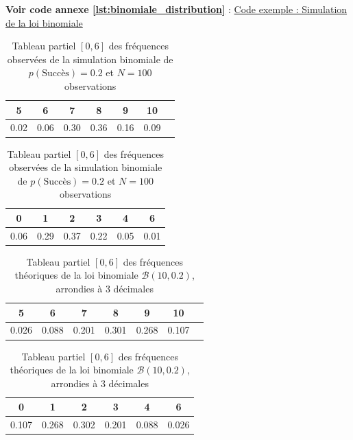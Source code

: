     \textbf{Voir code annexe \ref{lst:binomiale_distribution}} : \hyperlink{\ref{lst:binomiale_distribution}}{Code exemple : Simulation de la loi binomiale}
    \begin{table}[H]
      \centering
      \begin{minipage}{0.45\textwidth}
      \centering
      \begin{tabular}{c c c c c c c}
        \toprule
        5 & 6 & 7 & 8 & 9 & 10 \\
        \midrule
        0.02 & 0.06 & 0.30 & 0.36 & 0.16 & 0.09 \\
        \bottomrule
      \end{tabular}
      \caption{Tableau partiel $[5,10]$ des fréquences observées de la simulation binomiale de $p(\text{Succès})=0.8$ et $N=100$ observations}
      \label{tab:binomiale_1}
      \end{minipage}
      \hfill
      \begin{minipage}{0.45\textwidth}
      \centering
      \begin{tabular}{c c c c c c }
        \toprule
        0 & 1 & 2 & 3 & 4 & 6 \\
        \midrule
        0.06 & 0.29 & 0.37 & 0.22 & 0.05 & 0.01 \\
        \bottomrule
      \end{tabular}
      \caption{Tableau partiel $[0,6]$ des fréquences observées de la simulation binomiale de $p(\text{Succès})=0.2$ et $N=100$ observations}
      \label{tab:binomiale_2}
      \end{minipage}
    \end{table}

    \begin{table}[H]
      \centering
      \begin{minipage}{0.45\textwidth}
        \centering
          \begin{tabular}{c c c c c c c}
            \toprule
            5 & 6 & 7 & 8 & 9 & 10 \\
            \midrule
            0.026 & 0.088 & 0.201 & 0.301 & 0.268 & 0.107 \\
            \bottomrule
          \end{tabular}
          \caption{Tableau partiel $[5,10]$ des fréquences théoriques de la loi binomiale $\mathcal{B}(10, 0.8)$, arrondies à 3 décimales}
          \label{tab:binomiale_3}
      \end{minipage}
      \hfill
      \begin{minipage}{0.45\textwidth}
        \centering
        \begin{tabular}{c c c c c c }
          \toprule
          0 & 1 & 2 & 3 & 4 & 6 \\
          \midrule
          0.107 & 0.268 & 0.302 & 0.201 & 0.088 & 0.026 \\
          \bottomrule
        \end{tabular}
        \caption{Tableau partiel $[0,6]$ des fréquences théoriques de la loi binomiale $\mathcal{B}(10, 0.2)$, arrondies à 3 décimales}
        \label{tab:binomiale_4}
      \end{minipage}
    \end{table}

